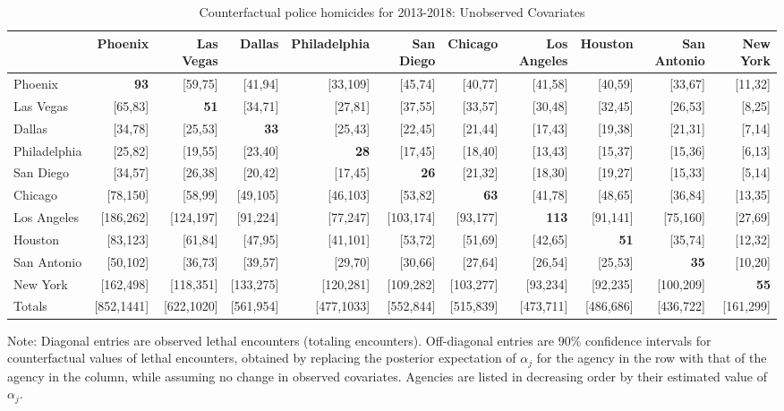 \begin{table}[h!]\centering\scriptsize\tabcolsep=0.1cm\caption{Counterfactual police homicides for 2013-2018: Unobserved Covariates} \label{table:counterfactual_unobs}\begin{tabular}{lrrrrrrrrrr}\hline \hline&Phoenix&Las Vegas&Dallas&Philadelphia&San Diego&Chicago&Los Angeles&Houston&San Antonio&New York\\
\hline
Phoenix&\textbf{93}&[59,75]&[41,94]&[33,109]&[45,74]&[40,77]&[41,58]&[40,59]&[33,67]&[11,32]\\
Las Vegas&[65,83]&\textbf{51}&[34,71]&[27,81]&[37,55]&[33,57]&[30,48]&[32,45]&[26,53]&[8,25]\\
Dallas&[34,78]&[25,53]&\textbf{33}&[25,43]&[22,45]&[21,44]&[17,43]&[19,38]&[21,31]&[7,14]\\
Philadelphia&[25,82]&[19,55]&[23,40]&\textbf{28}&[17,45]&[18,40]&[13,43]&[15,37]&[15,36]&[6,13]\\
San Diego&[34,57]&[26,38]&[20,42]&[17,45]&\textbf{26}&[21,32]&[18,30]&[19,27]&[15,33]&[5,14]\\
Chicago&[78,150]&[58,99]&[49,105]&[46,103]&[53,82]&\textbf{63}&[41,78]&[48,65]&[36,84]&[13,35]\\
Los Angeles&[186,262]&[124,197]&[91,224]&[77,247]&[103,174]&[93,177]&\textbf{113}&[91,141]&[75,160]&[27,69]\\
Houston&[83,123]&[61,84]&[47,95]&[41,101]&[53,72]&[51,69]&[42,65]&\textbf{51}&[35,74]&[12,32]\\
San Antonio&[50,102]&[36,73]&[39,57]&[29,70]&[30,66]&[27,64]&[26,54]&[25,53]&\textbf{35}&[10,20]\\
New York&[162,498]&[118,351]&[133,275]&[120,281]&[109,282]&[103,277]&[93,234]&[92,235]&[100,209]&\textbf{55}\\
\hline
Totals&[852,1441]&[622,1020]&[561,954]&[477,1033]&[552,844]&[515,839]&[473,711]&[486,686]&[436,722]&[161,299]\\
\hline\end{tabular}\begin{center}\begin{minipage}{1.05\textwidth} %
 {\footnotesize {\schape Note}: Diagonal entries are observed lethal encounters (totaling \totalincidentsten{} encounters). Off-diagonal entries are 90\% confidence intervals for counterfactual values of lethal encounters, obtained by replacing the posterior expectation of $\alpha_j$ for the agency in the row with that of the agency in the column, while assuming no change in observed covariates. Agencies are listed in decreasing order by their estimated value of $\alpha_j$.} 
 \end{minipage} 
 \end{center} 
 \end{table} 
